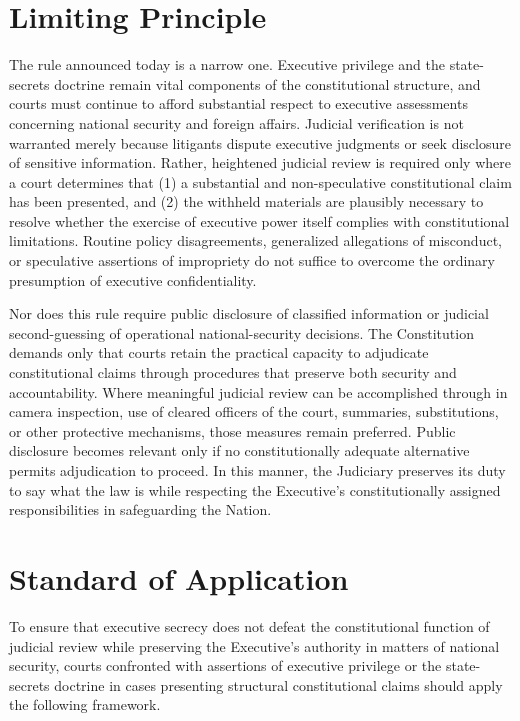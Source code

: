 \documentclass[12pt]{article}
\begin{document}
\section*{Limiting Principle}
The rule announced today is a narrow one.
Executive privilege and the state-secrets doctrine remain vital components of the constitutional structure, and courts must continue to afford substantial respect to executive assessments concerning national security and foreign affairs.
Judicial verification is not warranted merely because litigants dispute executive judgments or seek disclosure of sensitive information.
Rather, heightened judicial review is required only where a court determines that (1) a substantial and non-speculative constitutional claim has been presented, and (2) the withheld materials are plausibly necessary to resolve whether the exercise of executive power itself complies with constitutional limitations.
Routine policy disagreements, generalized allegations of misconduct, or speculative assertions of impropriety do not suffice to overcome the ordinary presumption of executive confidentiality.

Nor does this rule require public disclosure of classified information or judicial second-guessing of operational national-security decisions.
The Constitution demands only that courts retain the practical capacity to adjudicate constitutional claims through procedures that preserve both security and accountability.
Where meaningful judicial review can be accomplished through in camera inspection, use of cleared officers of the court, summaries, substitutions, or other protective mechanisms, those measures remain preferred.
Public disclosure becomes relevant only if no constitutionally adequate alternative permits adjudication to proceed.
In this manner, the Judiciary preserves its duty to say what the law is while respecting the Executive's constitutionally assigned responsibilities in safeguarding the Nation.

\section*{Standard of Application}
To ensure that executive secrecy does not defeat the constitutional function of judicial review while preserving the Executive's authority in matters of national security, courts confronted with assertions of executive privilege or the state-secrets doctrine in cases presenting structural constitutional claims should apply the following framework.
\end{document}
